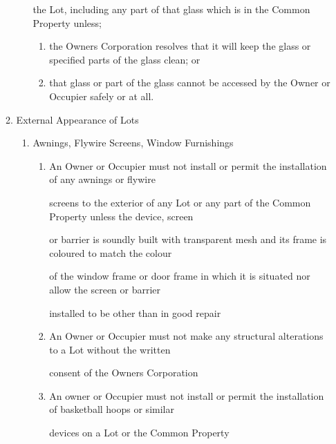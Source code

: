 \documentclass{article}
\begin{document}
\begin{enumerate}[label=\arabic*.]
\begin{enumerate}[label=\arabic{enumi}.\arabic*.]
\begin{enumerate}[label=(\arabic*)]
{\fontsize{10.02}{1}the Lot, including any part of that glass which is in the Common Property unless; }

\begin{enumerate}[label=(\alph*)]
\item {\fontsize{9.962}{1} the Owners Corporation resolves that it will keep the glass or specified parts of the glass clean; or }

\item {\fontsize{9.962}{1} that glass or part of the glass cannot be accessed by the Owner or Occupier safely or at all. }

\end{enumerate}
\end{enumerate}
\item {\fontsize{9.99}{1} External Appearance of Lots }

\begin{enumerate}[label=(\arabic*)]
\item {\fontsize{9.962}{1} Awnings, Flywire Screens, Window Furnishings }

\begin{enumerate}[label=(\alph*)]
\item {\fontsize{9.962}{1} An Owner or Occupier must not install or permit the installation of any awnings or flywire }

{\fontsize{10.02}{1}screens to the exterior of any Lot or any part of the Common Property unless the device, screen }

{\fontsize{10.02}{1}or barrier is soundly built with transparent mesh and its frame is coloured to match the colour }

{\fontsize{10.02}{1}of the window frame or door frame in which it is situated nor allow the screen or barrier }

{\fontsize{10.02}{1}installed to be other than in good repair }

\item {\fontsize{9.962}{1} An Owner or Occupier must not make any structural alterations to a Lot without the written }

{\fontsize{10.02}{1}consent of the Owners Corporation }

\item {\fontsize{9.962}{1} An owner or Occupier must not install or permit the installation of basketball hoops or similar }

{\fontsize{10.02}{1}devices on a Lot or the Common Property }

\newpage


\end{enumerate}
\end{enumerate}
\end{enumerate}
\end{enumerate}
\end{document}
